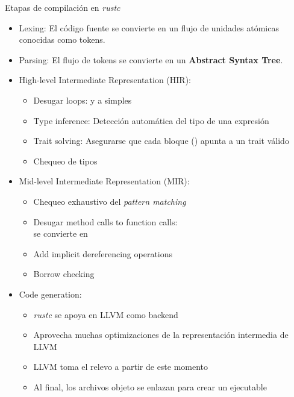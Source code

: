 \documentclass{beamer}
\begin{document}
\begin{frame}{Etapas de compilación en \emph{rustc}}
  \scriptsize

  \begin{itemize}
    \item Lexing: El código fuente se convierte en un flujo de unidades atómicas conocidas como tokens.
          \pause
    \item Parsing: El flujo de tokens se convierte en un \textbf{Abstract Syntax Tree}.
          \pause
    \item High-level Intermediate Representation (HIR):
          \begin{itemize}
            \scriptsize
            [circle]
            \item Desugar loops:  y  a simples 
            \item Type inference: Detección automática del tipo de una expresión
            \item Trait solving: Asegurarse que cada bloque () apunta a un trait válido
            \item Chequeo de tipos
          \end{itemize}
          \pause
    \item Mid-level Intermediate Representation (MIR):
          \begin{itemize}
            \scriptsize
            [circle]
            \item Chequeo exhaustivo del \emph{pattern matching}
            \item Desugar method calls to function calls:\\
                   se convierte en 
            \item Add implicit dereferencing operations
            \item Borrow checking
          \end{itemize}
          \pause
    \item Code generation:
          \begin{itemize}
            \scriptsize
            [circle]
            \item \emph{rustc} se apoya en LLVM como backend
            \item Aprovecha muchas optimizaciones de la representación intermedia de LLVM
            \item LLVM toma el relevo a partir de este momento
            \item Al final, los archivos objeto se enlazan para crear un ejecutable
          \end{itemize}
  \end{itemize}
\end{frame}
\end{document}
